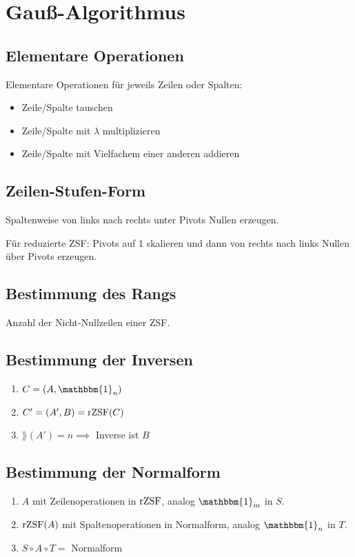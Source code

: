 \section*{Gauß-Algorithmus}

\subsection*{Elementare Operationen}
Elementare Operationen für jeweils Zeilen oder Spalten:
\begin{itemize}
	\item Zeile/Spalte tauschen
	\item Zeile/Spalte mit $\lambda$ multiplizieren
	\item Zeile/Spalte mit Vielfachem einer anderen addieren
\end{itemize}

\subsection*{Zeilen-Stufen-Form}
Spaltenweise von links nach rechts unter Pivots Nullen erzeugen.

Für reduzierte ZSF: Pivots auf 1 skalieren
und dann von rechts nach links Nullen über Pivots erzeugen.

\subsection*{Bestimmung des Rangs}
Anzahl der Nicht-Nullzeilen einer ZSF.

\subsection*{Bestimmung der Inversen}
\begin{enumerate}
	\item $C = (A, \mathbbm{1}_n)$
	\item $C'=(A',B)=\operatorname{rZSF}(C)$
	\item $\rang(A')=n \implies $ Inverse ist $B$
\end{enumerate}

\subsection*{Bestimmung der Normalform}
\begin{enumerate}
	\item $A$ mit Zeilenoperationen in $\operatorname{rZSF}$,
		analog $\mathbbm{1}_m$ in $S$.
	\item $\operatorname{rZSF}(A)$ mit Spaltenoperationen in Normalform,
		analog $\mathbbm{1}_n$ in $T$.
	\item $S \circ A \circ T = $ Normalform
\end{enumerate}

